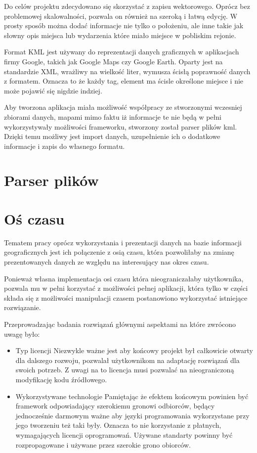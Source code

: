 Do celów projektu zdecydowano się skorzystać z zapisu wektorowego. Oprócz bez problemowej skalowalności, pozwala on również na szeroką i łatwą edycję. W prosty sposób można dodać informacje nie tylko o położeniu, ale inne takie jak słowny opis miejsca lub wydarzenia które miało miejsce w pobliskim rejonie.

Format KML jest używany do reprezentacji danych graficznych w aplikacjach firmy Google, takich jak Google Maps czy Google Earth. Oparty jest na standardzie XML, wrażliwy na wielkość liter, wymusza ścisłą poprawność danych z formatem. Oznacza to że każdy tag, element ma ścisle określone miejsce i nie może pojawić się nigdzie indziej.

Aby tworzona aplikacja miała możliwość współpracy ze stworzonymi wczesniej zbiorami danych, mapami mimo faktu iż informacje te nie będą w pełni wykorzystywały możliwości frameworku, stworzony został parser plików kml. Dzięki temu możliwy jest import danych, uzupełnienie ich o dodatkowe informacje i zapis do własnego formatu.

\section{Parser plików}
\label{sec:parser}

\section{Oś czasu}
\label{sec:timeLine}

Tematem pracy oprócz wykorzystania i prezentacji danych na bazie informacji geograficznych jest ich połączenie z osią czasu, która pozwoliłaby na zmianę prezentowanych danych ze względu na interesujący nas okres czasu.

Ponieważ własna implementacja osi czasu która nieograniczałaby użytkownika, pozwala mu w pełni korzystać z możliwości pełnej aplikacji, która tylko w części składa się z możliwości manipulacji czasem postanowiono wykorzystać istniejące rozwiązanie.

Przeprowadzając badania rozwiązań głównymi aspektami na które zwrócono uwagę było:

\begin{itemize}

\item

Typ licencji
Niezwykle ważne jest aby końcowy projekt był całkowicie otwarty dla dalszego rozwoju, pozwalał użytkownikom na adaptację rozwiązań dla swoich potrzeb. Z uwagi na to licencja musi pozwalać na nieograniczoną modyfikację kodu źródłowego.

\item

Wykorzystywane technologie
Pamiętając że efektem końcowym powinien być framework odpowiadający szerokiemu gronowi odbiorców, będący jednocześnie darmowym ważne aby języki programowania wykorzystane przy jego tworzeniu też taki były. Oznacza to nie korzystanie z płatnych, wymagających licencji oprogramowań. Używane standarty powinny być rozpropagowane i używane przez szerokie grono obiorców.

\end{itemize}

